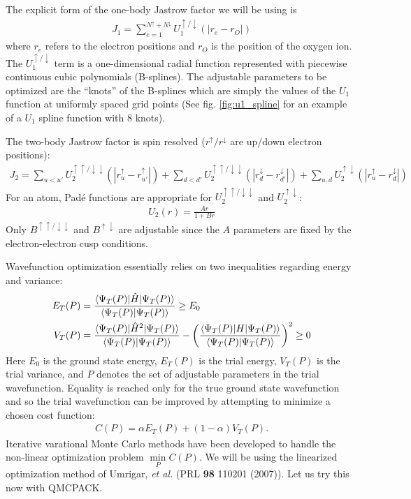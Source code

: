 {The explicit form of the one-body Jastrow factor we will be using is
\begin{align}\label{eq:J1}
  J_1 = \sum_{e=1}^{N^\uparrow+N^\downarrow}U_1^{\uparrow/\downarrow}(|r_e-r_O|)
\end{align}
where $r_e$ refers to the electron positions and $r_O$ is 
the position of the oxygen ion.  The $U_1^{\uparrow/\downarrow}$ term is a 
one-dimensional radial function represented with piecewise continuous cubic 
polynomials (B-splines).  The adjustable parameters to be optimized are the 
``knots'' of the B-splines which are simply the values of the $U_1$ function at 
uniformly spaced grid points (See fig. \ref{fig:u1_spline} for an example of a $U_1$ 
spline function with 8 knots).  

The two-body Jastrow factor is spin resolved ($r^\uparrow/r^\downarrow$ are up/down electron positions):
\begin{align}\label{eq:J2}
  J_2 = \sum_{u<u'}U_2^{\uparrow\uparrow/\downarrow\downarrow}(|r_u^\uparrow-r_{u'}^\uparrow|) + \sum_{d<d'}U_2^{\uparrow\uparrow/\downarrow\downarrow}(|r_d^\downarrow-r_{d'}^\downarrow|) + \sum_{u,d} U_2^{\uparrow\downarrow}(|r_u^\uparrow-r_d^\downarrow|)
\end{align}
For an atom, Pad\'{e} functions are appropriate for $U_2^{\uparrow\uparrow/\downarrow\downarrow}$ and $U_2^{\uparrow\downarrow}$:
\begin{align}
  U_2(r) = \frac{Ar}{1+Br}
\end{align}
Only $B^{\uparrow\uparrow/\downarrow\downarrow}$ and $B^{\uparrow\downarrow}$ are adjustable since the $A$ parameters are fixed by the electron-electron cusp conditions.

Wavefunction optimization essentially relies on two inequalities regarding energy and variance:
\begin{align}
  E_T(P) &= \frac{\expvalh{\Psi_T(P)}{H}{\Psi_T(P)}}{\overlap{\Psi_T(P)}{\Psi_T(P)}} \ge E_0 \\
  V_T(P) &= \frac{\expval{\Psi_T(P)}{\hat{H}^2}{\Psi_T(P)}}{\overlap{\Psi_T(P)}{\Psi_T(P)}} - \left(\frac{\expval{\Psi_T(P)}{H}{\Psi_T(P)}}{\overlap{\Psi_T(P)}{\Psi_T(P)}}\right)^2 \ge 0   
\end{align}
Here $E_0$ is the ground state energy, $E_T(P)$ is the trial energy, $V_T(P)$ is the trial variance, and $P$ denotes the set of adjustable parameters in the trial wavefunction.  Equality is reached only for the true ground state wavefunction and so the trial wavefunction can be improved by attempting to minimize a chosen cost function: 
\begin{align}
  C(P) = \alpha E_T(P) + (1-\alpha) V_T(P).
\end{align}  
Iterative varational Monte Carlo methods have been developed to handle the non-linear optimization problem $\min\limits_P C(P)$.  We will be using the linearized optimization method of Umrigar, \emph{et al.} (PRL \textbf{98} 110201 (2007)).  Let us try this now with QMCPACK.
}

